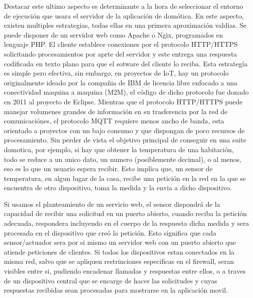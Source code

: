 Destacar este ultimo aspecto es determinante a la hora de seleccionar el entorno de ejecución que usara el servidor de la aplicación de domótica. En este aspecto, existen multiples estrategias, todas ellas en una primera aproximación valdias. Se puede disponer de un servidor web como Apache o Ngix, programados en lenguaje PHP. El cliente establece conexiones por el protocolo HTTP/HTTPS solicitando procesamientos por aprte del servidor y este entrega una respuesta codificada en texto plano para que el sotware del cliente lo reciba. Esta estrategía es simple pero efectiva, sin embargo, en proyectos de IoT, hay un protocolo originalmente ideado por la compañia de IBM de licencia libre enfocado a una conectividad maquina a maquina (M2M), el código de dicho protocolo fue donado en 2011 al proyecto de Eclipse. Mientras que el protocolo HTTP/HTTPS puede manejar volumenes grandes de información en su trasferencia por la red de comunicaciónes, el protocolo MQTT requiere menos ancho de banda, esta orientado a proyectos con un bajo consumo  y que dispongan de poco recursos de procesamiento. Sin perder de vista el objetivo principal de conseguir en una suite domotica, por ejemplo, si hay que obtener la temperatura de una habitación, todo se reduce a un unico dato, un numero (posiblemente decimal), o al menos, eso es lo que un usuario espera recibir. Esto implica que, un sensor de temperatura, en algun lugar de la casa, recibe una petición en la red en la que se encuentra de otro dispositivo, toma la medida y la envia a dicho dispositivo.

Si usamos el planteamiento de un servicio web, el sensor dispondrá de la capacidad de recibir una solicitud en un puerto abierto, cuando reciba la petición adecuada, respondera incluyendo en el cuerpo de la respuesta dicha medida y sera procesada en el dispositivo que creó la petición. Esto significa que cada sensor/actuador sera por si mismo un servidor web con un puerto abierto que atiende peticiones de clientes. Si todos los dispositivos estan conectados en la misma red, salvo que se apliquen restrinciones especificas en el firewall, seran visibles entre si, pudiendo encadenar llamadas y respuestas entre ellos, o a traves de un dispositivo central que se encarge de hacer las solicitudes y cuyas respuestas recibidas sean procesadas para mostrarse en la aplicación movil.


